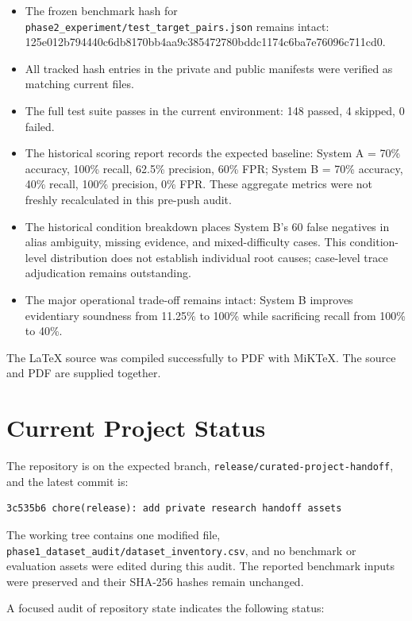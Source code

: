 \documentclass[11pt,a4paper]{article}
\begin{document}
\begin{itemize}[leftmargin=1.5em]
  \item The frozen benchmark hash for \texttt{phase2\_experiment/test\_target\_pairs.json} remains intact: 125e012b794440c6db8170bb4aa9c385472780bddc1174c6ba7e76096c711cd0.
  \item All tracked hash entries in the private and public manifests were verified as matching current files.
  \item The full test suite passes in the current environment: 148 passed, 4 skipped, 0 failed.
  \item The historical scoring report records the expected baseline: System A = 70\% accuracy, 100\% recall, 62.5\% precision, 60\% FPR; System B = 70\% accuracy, 40\% recall, 100\% precision, 0\% FPR. These aggregate metrics were not freshly recalculated in this pre-push audit.
  \item The historical condition breakdown places System B's 60 false negatives in alias ambiguity, missing evidence, and mixed-difficulty cases. This condition-level distribution does not establish individual root causes; case-level trace adjudication remains outstanding.
  \item The major operational trade-off remains intact: System B improves evidentiary soundness from 11.25\% to 100\% while sacrificing recall from 100\% to 40\%.
\end{itemize}

The LaTeX source was compiled successfully to PDF with MiKTeX. The source and PDF are supplied together.

\section{Current Project Status}

The repository is on the expected branch, \texttt{release/curated-project-handoff}, and the latest commit is:

\begin{verbatim}
3c535b6 chore(release): add private research handoff assets
\end{verbatim}

The working tree contains one modified file, \texttt{phase1\_dataset\_audit/dataset\_inventory.csv}, and no benchmark or evaluation assets were edited during this audit. The reported benchmark inputs were preserved and their SHA-256 hashes remain unchanged.

A focused audit of repository state indicates the following status:
\end{document}
